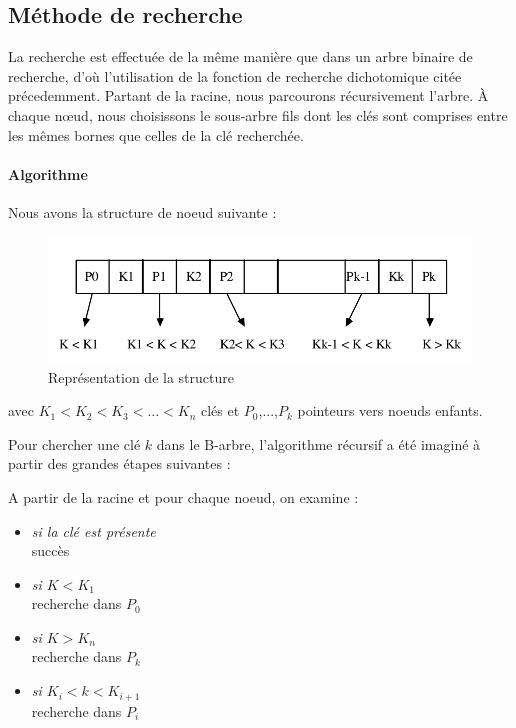 \subsection{Méthode de recherche}
La recherche est effectuée de la même manière que dans un arbre binaire de recherche, d'où l'utilisation de la fonction de recherche dichotomique citée précedemment. Partant de la racine, nous parcourons récursivement l’arbre. À chaque nœud, nous choisissons le sous-arbre fils dont les clés sont comprises entre les mêmes bornes que celles de la clé recherchée.
\paragraph{Algorithme} Nous avons la structure de noeud suivante :
\begin{figure}[hbt]
	\centering
	\includegraphics[scale=0.5]{node}
	\caption{Représentation de la structure}
	\label{fig:node}
\end{figure}

avec $K_1 < K_2 < K_3 < \dots < K_n$ clés et $P_0$,...,$P_k$ pointeurs vers noeuds enfants.

Pour chercher une clé $k$ dans le B-arbre, l'algorithme récursif a été imaginé à partir des grandes étapes suivantes : 

A partir de la racine et pour chaque noeud, on examine :
\begin{itemize}
\item \emph{si la clé est présente} \\ succès
\item \emph{si $K<K_1$} \\recherche dans $P_0$
\item \emph{si $K>K_n$}\\ recherche dans $P_k$
\item \emph{si $K_i < k < K_{i+1}$}\\ recherche dans $P_i$
\end{itemize}

